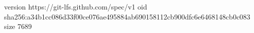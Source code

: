 version https://git-lfs.github.com/spec/v1
oid sha256:a34b1cc086d33f00ce076ae495884ab690158112cb900dfc6e6468148cb0c083
size 7689
